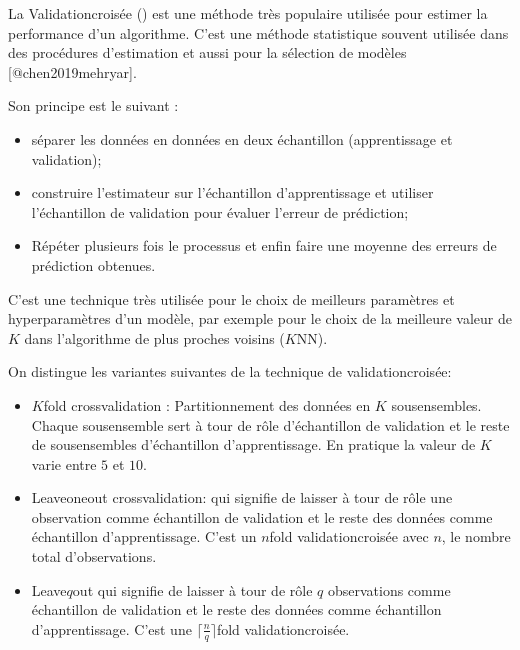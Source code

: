 \documentclass[letterpaper,11pt,english]{sphinxmanual}
\begin{document}
\sphinxAtStartPar
{}

\sphinxAtStartPar
La Validation\sphinxhyphen{}croisée () est une méthode très
populaire utilisée pour estimer la performance d’un algorithme. C’est
une méthode statistique souvent utilisée dans des procédures
d’estimation et aussi pour la sélection de modèles {[}@chen2019mehryar{]}.

\sphinxAtStartPar
Son principe est le suivant :
\begin{itemize}
\item {} 
\sphinxAtStartPar
séparer les données en données en deux échantillon (apprentissage et
validation);

\item {} 
\sphinxAtStartPar
construire l’estimateur sur l’échantillon d’apprentissage et utiliser
l’échantillon de validation pour évaluer l’erreur de prédiction;

\item {} 
\sphinxAtStartPar
Répéter plusieurs fois le processus et enfin faire une moyenne des
erreurs de prédiction obtenues.

\end{itemize}

\sphinxAtStartPar
C’est une technique très utilisée pour le choix de meilleurs paramètres
et hyperparamètres d’un modèle, par exemple pour le choix de la
meilleure valeur de \(K\) dans l’algorithme de plus proches voisins
(\(K\)\sphinxhyphen{}NN).

\sphinxAtStartPar
On distingue les variantes suivantes de la technique de
validation\sphinxhyphen{}croisée:
\begin{itemize}
\item {} 
\sphinxAtStartPar
\(K\)\sphinxhyphen{}fold cross\sphinxhyphen{}validation : Partitionnement des données en
\(K\) sous\sphinxhyphen{}ensembles. Chaque sous\sphinxhyphen{}ensemble sert à tour de rôle
d’échantillon de validation et le reste de sous\sphinxhyphen{}ensembles
d’échantillon d’apprentissage. En pratique la valeur de \(K\)
varie entre \(5\) et \(10\).

\item {} 
\sphinxAtStartPar
Leave\sphinxhyphen{}one\sphinxhyphen{}out cross\sphinxhyphen{}validation: qui signifie de laisser à tour de
rôle une observation comme échantillon de validation et le reste des
données comme échantillon d’apprentissage. C’est un \(n\)\sphinxhyphen{}fold
validation\sphinxhyphen{}croisée avec \(n\), le nombre total d’observations.

\item {} 
\sphinxAtStartPar
Leave\sphinxhyphen{}\(q\)\sphinxhyphen{}out qui signifie de laisser à tour de rôle \(q\)
observations comme échantillon de validation et le reste des données
comme échantillon d’apprentissage. C’est une
\(\lceil  \frac{n}{q}\rceil\)\sphinxhyphen{}fold validation\sphinxhyphen{}croisée.

\end{itemize}
\end{document}
